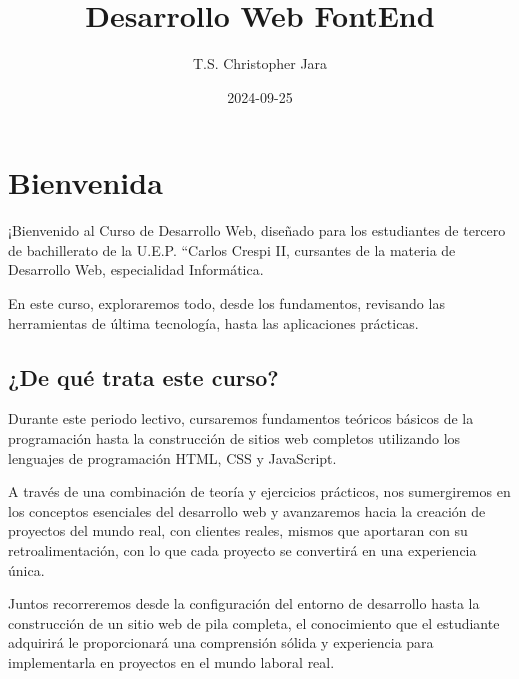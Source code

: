 \documentclass[
  letterpaper,
  DIV=11,
  numbers=noendperiod]{scrreprt}
\title{Desarrollo Web FontEnd}
\author{T.S. Christopher Jara}
\date{2024-09-25}
\renewcommand*\contentsname{Table of contents}
\newcommand\contentsname{Table of contents}
\begin{document}
\maketitle

\renewcommand*\contentsname{Table of contents}
{
\hypersetup{linkcolor=}
\setcounter{tocdepth}{2}
\tableofcontents
}


\chapter*{Bienvenida}\label{bienvenida}


¡Bienvenido al Curso de Desarrollo Web, diseñado para los estudiantes de
tercero de bachillerato de la U.E.P. ``Carlos Crespi II, cursantes de la
materia de Desarrollo Web, especialidad Informática.

En este curso, exploraremos todo, desde los fundamentos, revisando las
herramientas de última tecnología, hasta las aplicaciones prácticas.

\section*{\texorpdfstring{\textbf{¿De qué trata este
curso?}}{¿De qué trata este curso?}}\label{de-quuxe9-trata-este-curso}


Durante este periodo lectivo, cursaremos fundamentos teóricos básicos de
la programación hasta la construcción de sitios web completos utilizando
los lenguajes de programación HTML, CSS y JavaScript.

A través de una combinación de teoría y ejercicios prácticos, nos
sumergiremos en los conceptos esenciales del desarrollo web y
avanzaremos hacia la creación de proyectos del mundo real, con clientes
reales, mismos que aportaran con su retroalimentación, con lo que cada
proyecto se convertirá en una experiencia única.

Juntos recorreremos desde la configuración del entorno de desarrollo
hasta la construcción de un sitio web de pila completa, el conocimiento
que el estudiante adquirirá le proporcionará una comprensión sólida y
experiencia para implementarla en proyectos en el mundo laboral real.
\end{document}

